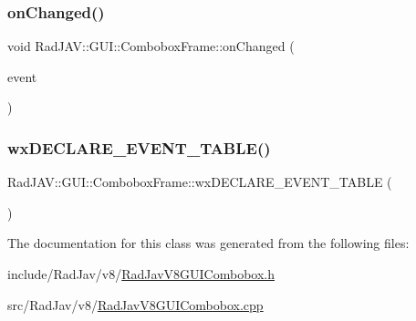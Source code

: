 \subsubsection{\texorpdfstring{on\+Changed()}{onChanged()}}
{\footnotesize\ttfamily void Rad\+J\+A\+V\+::\+G\+U\+I\+::\+Combobox\+Frame\+::on\+Changed (\begin{DoxyParamCaption}\item[{wx\+Command\+Event \&}]{event }\end{DoxyParamCaption})}

\mbox{\label{class_rad_j_a_v_1_1_g_u_i_1_1_combobox_frame_a984cc0c81a05cf531e443f7e395067c4}} 
\subsubsection{\texorpdfstring{wx\+D\+E\+C\+L\+A\+R\+E\+\_\+\+E\+V\+E\+N\+T\+\_\+\+T\+A\+B\+L\+E()}{wxDECLARE\_EVENT\_TABLE()}}
{\footnotesize\ttfamily Rad\+J\+A\+V\+::\+G\+U\+I\+::\+Combobox\+Frame\+::wx\+D\+E\+C\+L\+A\+R\+E\+\_\+\+E\+V\+E\+N\+T\+\_\+\+T\+A\+B\+LE (\begin{DoxyParamCaption}{ }\end{DoxyParamCaption})\hspace{0.3cm}{\ttfamily [protected]}}



The documentation for this class was generated from the following files\+:\begin{DoxyCompactItemize}
\item 
include/\+Rad\+Jav/v8/\mbox{\hyperlink{_rad_jav_v8_g_u_i_combobox_8h}{Rad\+Jav\+V8\+G\+U\+I\+Combobox.\+h}}\item 
src/\+Rad\+Jav/v8/\mbox{\hyperlink{_rad_jav_v8_g_u_i_combobox_8cpp}{Rad\+Jav\+V8\+G\+U\+I\+Combobox.\+cpp}}\end{DoxyCompactItemize}
